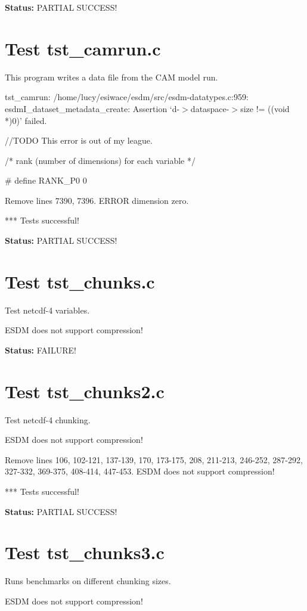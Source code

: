 {\bf \large Status: } PARTIAL SUCCESS!

\section{Test tst\_camrun.c}

This program writes a data file from the CAM model run.

tst\_camrun: /home/lucy/esiwace/esdm/src/esdm-datatypes.c:959: esdmI\_dataset\_metadata\_create: Assertion `d-$>$dataspace-$>$size != ((void *)0)' failed.

//TODO This error is out of my league.

/* rank (number of dimensions) for each variable */

\#   define RANK\_P0 0

Remove lines 7390, 7396. ERROR dimension zero.

*** Tests successful!

{\bf \large Status: } PARTIAL SUCCESS!

\section{Test tst\_chunks.c}

Test netcdf-4 variables.

ESDM does not support compression!

{\bf \large Status: } FAILURE!

\section{Test tst\_chunks2.c}

Test netcdf-4 chunking.

ESDM does not support compression!

Remove lines 106, 102-121, 137-139, 170, 173-175, 208, 211-213, 246-252, 287-292, 327-332, 369-375, 408-414, 447-453. ESDM does not support compression!

*** Tests successful!

{\bf \large Status: } PARTIAL SUCCESS!

\section{Test tst\_chunks3.c}

Runs benchmarks on different chunking sizes.

ESDM does not support compression!

